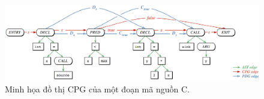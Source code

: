 
\begin{figure}[H]
  \includegraphics[width=1\columnwidth]{figures/c2/c2_cpg_yamaguchi.png}
  \centering
  \caption{Minh họa đồ thị CPG của một đoạn mã nguồn C.}
  \label{img:c2_cpg_yamaguchi}
\end{figure}


